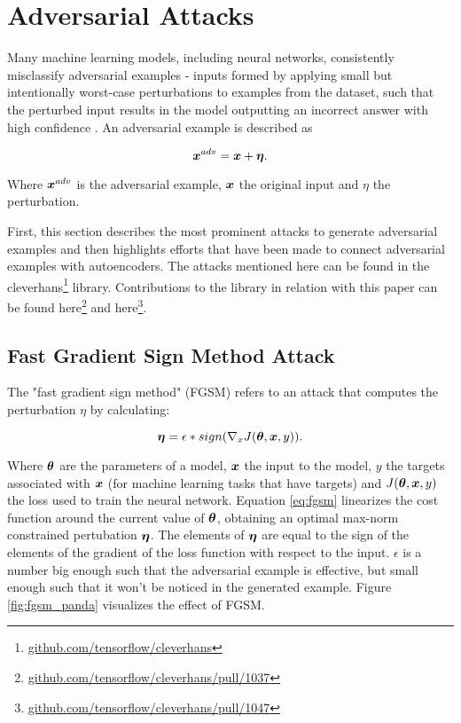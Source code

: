 \section{Adversarial Attacks}\label{sec:adversarial_attacks}

Many machine learning models, including neural networks, consistently
misclassify adversarial examples - inputs formed by applying small but
intentionally worst-case perturbations to examples from the dataset, such that
the perturbed input results in the model outputting an incorrect answer with
high confidence \cite{goodfellow2014explaining}. An adversarial example is
described as

\begin{equation}
    \boldsymbol{x}^{adv}  = \boldsymbol{x} + \boldsymbol{\eta}.
\end{equation}

Where $\boldsymbol{x}^{adv}$ is the adversarial example, $\boldsymbol{x}$ the original input and $\eta$
the perturbation.


First, this section describes the most prominent attacks to generate
adversarial examples and then highlights efforts that have been made to connect
adversarial examples with autoencoders. The attacks mentioned here can be found
in the
cleverhans\footnote{\href{https://github.com/tensorflow/cleverhans}{github.com/tensorflow/cleverhans}}
library. Contributions to the library in relation with this paper can be found
here\footnote{\href{http://github.com/tensorflow/cleverhans/pull/1037}{github.com/tensorflow/cleverhans/pull/1037}}
and
here\footnote{\href{http://github.com/tensorflow/cleverhans/pull/1047}{github.com/tensorflow/cleverhans/pull/1047}}.


\subsection{Fast Gradient Sign Method Attack}
The "fast gradient sign method" (FGSM) refers to an attack that computes the
perturbation $\eta$ by calculating:

\begin{equation}\label{eq:fgsm}
    \boldsymbol{\eta} = \epsilon * sign(\nabla_x J (\boldsymbol{\theta}, \boldsymbol{x}, y)).
\end{equation}

Where $\boldsymbol{\theta}$ are the parameters of a model, $\boldsymbol{x}$ the input to the
model, $y$ the targets associated with $\boldsymbol{x}$ (for machine learning tasks
that have targets) and $J(\boldsymbol{\theta}, \boldsymbol{x}, y)$ the loss used to train
the neural network. Equation \ref{eq:fgsm} linearizes the cost function around
the current value of $\boldsymbol{\theta}$, obtaining an optimal max-norm constrained
pertubation $\boldsymbol{\eta}$. The elements of $\boldsymbol{\eta}$ are equal to the sign of
the elements of the gradient of the loss function with respect to the input.
$\epsilon$ is a number big enough such that the adversarial example is
effective, but small enough such that it won't be noticed in the generated
example. Figure \ref{fig:fgsm_panda} \cite{goodfellow2014explaining} visualizes
the effect of FGSM.


